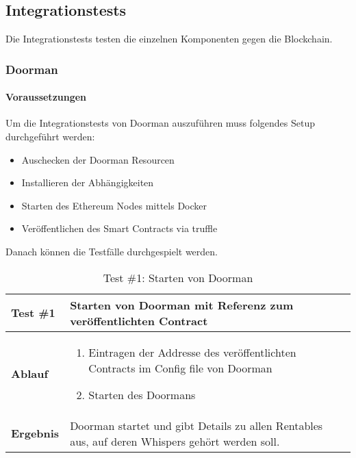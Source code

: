 \subsection{Integrationstests}
Die Integrationstests testen die einzelnen Komponenten gegen die Blockchain. 

\subsubsection{Doorman}

\paragraph{Voraussetzungen}

Um die Integrationstests von Doorman auszuführen muss folgendes Setup durchgeführt werden:

\begin{itemize}
    \item Auschecken der Doorman Resourcen
    \item Installieren der Abhängigkeiten
    \item Starten des Ethereum Nodes mittels Docker
    \item Veröffentlichen des Smart Contracts via truffle 
\end{itemize}

Danach können die Testfälle durchgespielt werden.
    
\begin{table}[H]
\centering
\caption{Test \#1: Starten von Doorman}
\label{my-label}
\begin{tabular}{@{}L{1.6cm}L{11cm}@{}}
\toprule
\textbf{Test \#1}
& Starten von Doorman mit Referenz zum veröffentlichten Contract
\\ \midrule
\textbf{Ablauf}
& 
\begin{enumerate}
    \item Eintragen der Addresse des veröffentlichten Contracts im Config file von Doorman
    \item Starten des Doormans
\end{enumerate}
\\ \midrule
\textbf{Ergebnis}
& Doorman startet und gibt Details zu allen Rentables aus, auf deren Whispers gehört werden soll.

\\ \bottomrule
\end{tabular}
\end{table}

